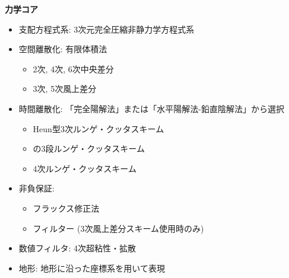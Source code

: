 {\bf 力学コア}
\begin{itemize}
 \item 支配方程式系: 3次元完全圧縮非静力学方程式系
 \item 空間離散化: 有限体積法
    \begin{itemize}
      \item 2次, 4次, 6次中央差分
      \item 3次, 5次風上差分
    \end{itemize}
 \item 時間離散化: 「完全陽解法」または「水平陽解法-鉛直陰解法」から選択
    \begin{itemize}
      \item Heun型3次ルンゲ・クッタスキーム
      \item \citet{Wicker_2002}の3段ルンゲ・クッタスキーム
      \item 4次ルンゲ・クッタスキーム
    \end{itemize}
 \item 非負保証:
    \begin{itemize}
      \item フラックス修正法 \citep[Flux Corrected Transport, FCT; ][]{zalesak_1979}
      \item \citet{Koren_1993}フィルター  (3次風上差分スキーム使用時のみ)
    \end{itemize}
 \item 数値フィルタ: 4次超粘性・拡散
 \item 地形: 地形に沿った座標系を用いて表現
\end{itemize}

